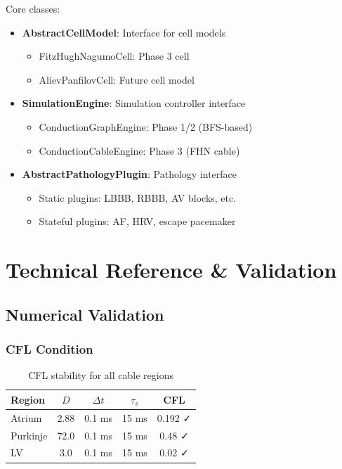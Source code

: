 \documentclass[12pt,oneside,a4paper]{book}
\begin{document}
Core classes:

\begin{itemize}
  \item \textbf{AbstractCellModel}: Interface for cell models
    \begin{itemize}
      \item FitzHughNagumoCell: Phase 3 cell
      \item AlievPanfilovCell: Future cell model
    \end{itemize}

  \item \textbf{SimulationEngine}: Simulation controller interface
    \begin{itemize}
      \item ConductionGraphEngine: Phase 1/2 (BFS-based)
      \item ConductionCableEngine: Phase 3 (FHN cable)
    \end{itemize}

  \item \textbf{AbstractPathologyPlugin}: Pathology interface
    \begin{itemize}
      \item Static plugins: LBBB, RBBB, AV blocks, etc.
      \item Stateful plugins: AF, HRV, escape pacemaker
    \end{itemize}
\end{itemize}


\chapter{Technical Reference \& Validation}

\section{Numerical Validation}

\subsection{CFL Condition}
\begin{table}[htb]
\centering
\begin{tabularx}{\textwidth}{|l|c|c|c|c|}
\hline
Region & $D$ & $\Delta t$ & $\tau_s$ & CFL \\
\hline
Atrium & 2.88 & 0.1 ms & 15 ms & 0.192 ✓ \\
Purkinje & 72.0 & 0.1 ms & 15 ms & 0.48 ✓ \\
LV & 3.0 & 0.1 ms & 15 ms & 0.02 ✓ \\
\hline
\end{tabularx}
\caption{CFL stability for all cable regions}
\label{tab:cfl}
\end{table}
\end{document}
